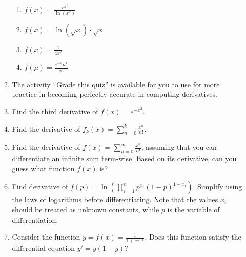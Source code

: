 \documentclass{article}
\begin{document}
\begin{itemize}
\begin{enumerate}
\begin{enumerate}
                    \item $\displaystyle f(x) = \frac{e^{x^2}}{\ln(x^2)}$
                    \item $\displaystyle f(x) = \ln(\sqrt{x})\cdot \sqrt{x}$
                    \item $\displaystyle f(x) = \frac{1}{4x^2}$
                    \item $\displaystyle f(\mu) = \frac{e^{-\mu}\mu^x}{x!}$
                                    \end{enumerate}
                \item The activity ``Grade this quiz'' is available for you to use for more practice in becoming perfectly accurate in computing derivatives.          
                \item Find the third derivative of $f(x) = e^{-x^2}$.
                \item Find the derivative of $\displaystyle f_k(x) = \sum_{n=0}^k \frac{x^n}{n!}$.
                 \item Find the derivative of $\displaystyle f(x) = \sum_{n=0}^\infty \frac{x^n}{n!}$, assuming that you can differentiate an infinite sum term-wise. Based on its derivative, can you guess what function $f(x)$ is?
                \item Find derivative of $\displaystyle f(p) = \ln{\left(\prod_{i=1}^n p^{x_i}(1-p)^{1-x_i}\right)}$. Simplify using the laws of logarithms before differentiating. Note that the values $x_i$ should be treated as unknown constants, while $p$ is the variable of differentiation.
          
                \item Consider the function $\displaystyle y=f(x) = \frac{1}{1+ce^{-x}}$.  Does this function satisfy the differential equation $y'=y(1-y)$?
                
           
                \end{enumerate}
        \end{itemize}
\end{document}
